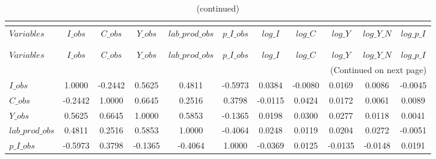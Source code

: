  
\begin{center}
\begin{longtable}{lcccccccccc} 
\caption{MATRIX OF CORRELATIONS}\\
 \label{Table:th_corr_matrix}\\
\toprule 
$Variables       $	 & 	 $           I\_obs$	 & 	 $           C\_obs$	 & 	 $           Y\_obs$	 & 	 $  lab\_prod\_obs$	 & 	 $       p\_I\_obs$	 & 	 $           log\_I$	 & 	 $           log\_C$	 & 	 $           log\_Y$	 & 	 $       log\_Y\_N$	 & 	 $       log\_p\_I$\\
\midrule \endfirsthead 
\caption{(continued)}\\
 \toprule \\ 
$Variables       $	 & 	 $           I\_obs$	 & 	 $           C\_obs$	 & 	 $           Y\_obs$	 & 	 $  lab\_prod\_obs$	 & 	 $       p\_I\_obs$	 & 	 $           log\_I$	 & 	 $           log\_C$	 & 	 $           log\_Y$	 & 	 $       log\_Y\_N$	 & 	 $       log\_p\_I$\\
\midrule \endhead 
\midrule \multicolumn{11}{r}{(Continued on next page)} \\ \bottomrule \endfoot 
\bottomrule \endlastfoot 
$I\_obs          $	 & 	            1.0000	 & 	           -0.2442	 & 	            0.5625	 & 	            0.4811	 & 	           -0.5973	 & 	            0.0384	 & 	           -0.0080	 & 	            0.0169	 & 	            0.0086	 & 	           -0.0045 \\ 
$C\_obs          $	 & 	           -0.2442	 & 	            1.0000	 & 	            0.6645	 & 	            0.2516	 & 	            0.3798	 & 	           -0.0115	 & 	            0.0424	 & 	            0.0172	 & 	            0.0061	 & 	            0.0089 \\ 
$Y\_obs          $	 & 	            0.5625	 & 	            0.6645	 & 	            1.0000	 & 	            0.5853	 & 	           -0.1365	 & 	            0.0198	 & 	            0.0300	 & 	            0.0277	 & 	            0.0118	 & 	            0.0041 \\ 
$lab\_prod\_obs  $	 & 	            0.4811	 & 	            0.2516	 & 	            0.5853	 & 	            1.0000	 & 	           -0.4064	 & 	            0.0248	 & 	            0.0119	 & 	            0.0204	 & 	            0.0272	 & 	           -0.0051 \\ 
$p\_I\_obs       $	 & 	           -0.5973	 & 	            0.3798	 & 	           -0.1365	 & 	           -0.4064	 & 	            1.0000	 & 	           -0.0369	 & 	            0.0125	 & 	           -0.0135	 & 	           -0.0148	 & 	            0.0191 \\ 

\end{longtable}
\end{center}
